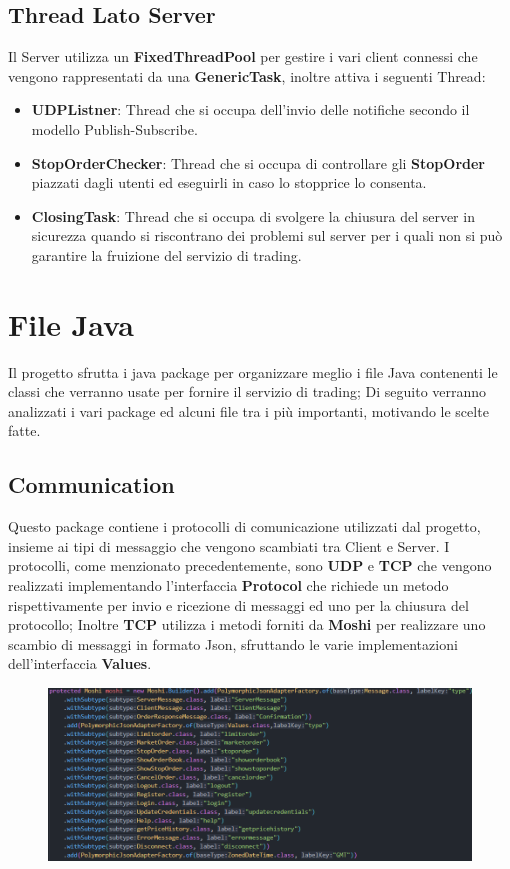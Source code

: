 \documentclass{article}
\begin{document}
\subsection{Thread Lato Server}
Il Server utilizza un \textbf{FixedThreadPool} per gestire i vari client connessi che vengono rappresentati da una \textbf{GenericTask}, inoltre attiva i seguenti Thread:
\begin{itemize}
  \item \textbf{UDPListner}: Thread che si occupa dell'invio delle notifiche secondo il modello Publish-Subscribe.
  \item \textbf{StopOrderChecker}: Thread che si occupa di controllare gli \textbf{StopOrder} piazzati dagli utenti ed eseguirli in caso lo stopprice lo consenta.
  \item \textbf{ClosingTask}: Thread che si occupa di svolgere la chiusura del server in sicurezza quando si riscontrano dei problemi sul server per i quali non si può garantire la fruizione del servizio di trading.
\end{itemize}

\section{File Java}
Il progetto sfrutta i java package per organizzare meglio i file Java contenenti le classi che verranno usate per fornire il servizio di trading; Di seguito verranno analizzati i vari package ed alcuni file tra i più importanti, motivando le scelte fatte.
\subsection{Communication}
Questo package contiene i protocolli di comunicazione utilizzati dal progetto, insieme ai tipi di messaggio che vengono scambiati tra Client e Server.
I protocolli, come menzionato precedentemente, sono \textbf{UDP} e \textbf{TCP} che vengono realizzati implementando l'interfaccia \textbf{Protocol} che richiede un metodo rispettivamente per invio e ricezione di messaggi ed uno per la chiusura del protocollo;
Inoltre \textbf{TCP} utilizza i metodi forniti da \textbf{Moshi} per realizzare uno scambio di messaggi in formato Json, sfruttando le varie implementazioni dell'interfaccia \textbf{Values}.

\begin{figure} %
  \centering
  \includegraphics[width=\linewidth]{Moshi-Classi.png} %
\end{figure}
\end{document}
